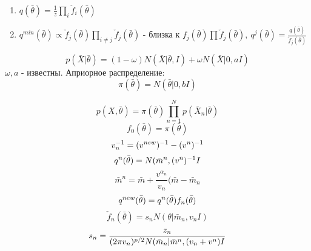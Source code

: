 \begin{enumerate}
	\item $q(\bar{\theta}) = \frac{1}{z} \prod_i \check{f}_i(\bar{\theta})$
	\item $ q^{min}(\bar{\theta}) \propto \check{f}_j(\bar{\theta}) \prod_{i \neq j} \check{f}_j(\bar{\theta}) $ - близка к $f_j(\bar{\theta})\prod \check{f}_j(\bar{\theta}), \ q^j(\bar{\theta}) = \frac{q(\bar{\theta})}{\check{f}_j(\bar{\theta})}$
\end{enumerate}
\begin{example}
	$$p(\bar{X}|\bar{\theta}) = (1-\omega) N(\bar{X}|\bar{\theta},I) + \omega N(\bar{X}|0,aI)$$
	$\omega, a$ - известны. Априорное распределение:
	$$ \pi(\bar{\theta}) = N(\bar{\theta}|0,bI) $$

	$$ p(X, \bar{\theta}) = \pi(\bar{\theta}) \prod_{n=1}^N p(\bar{X}_n|\bar{\theta}) $$
	$$ f_0(\bar{\theta}) = \pi(\bar{\theta}) $$
	$$ v_n^{-1} = (v^{new})^{-1} - (v^{\\n})^{-1} $$
	$$ q^n(\bar{\theta}) = N(\bar{m}^{\\n}, (v^{\\n})^{-1}I$$
	$$ \bar{m}^n  = \bar{m} + \frac{v^{\alpha_n}}{v_n} (\bar{m} - \bar{m}_n$$
	$$ q^{new}(\bar{\theta}) = q^{\\n}(\bar{\theta})f_n(\bar{\theta}) $$
	$$ \check{f}_n(\bar{\theta}) = s_n N(\theta| \bar{m}_n, v_nI) $$
	$$ s_n = \frac{z_n}{(2\pi v_n)^{p/2}N(\bar{m}_n| \bar{m}^{\\n}, (v_n + v^{\\n})I} $$
\end{example}

